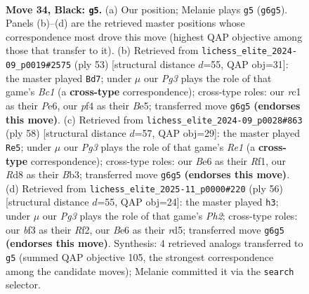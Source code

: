 \documentclass[11pt]{article}
\begin{document}
\clearpage

\begin{figure}[p]\centering
\begin{subfigure}{0.46\textwidth}\centering
\resizebox{\linewidth}{!}{%
\newchessgame
\chessboard[
  setfen={3r1kr1/1p3p1p/4b1p1/p2p4/5P2/3K1BP1/PP3N1P/2R3R1 b - - 2 34},
  showmover=false,
  pgfstyle=straightmove, color=movearrow, markmove={g6-g5}
]}
\caption{}
\end{subfigure}\hfill
\begin{subfigure}{0.46\textwidth}\centering
\resizebox{\linewidth}{!}{%
\newchessgame
\chessboard[
  setfen={r1b2rk1/5p2/p3p2P/4b1p1/Np6/3pB3/PP4P1/2KR3R b - - 1 27},
  showmover=false,
  pgfstyle=straightmove, color=movearrow, markmove={c8-d7}
]}
\caption{}
\end{subfigure}
\\[4pt]
\begin{subfigure}{0.46\textwidth}\centering
\resizebox{\linewidth}{!}{%
\newchessgame
\chessboard[
  setfen={3r1k2/ppr3p1/7p/2P2p2/5P2/1Bn4P/P5PK/4RR2 w - - 0 30},
  showmover=false,
  pgfstyle=straightmove, color=movearrow, markmove={e1-e5}
]}
\caption{}
\end{subfigure}\hfill
\begin{subfigure}{0.46\textwidth}\centering
\resizebox{\linewidth}{!}{%
\newchessgame
\chessboard[
  setfen={4r1k1/8/bp5p/p2r1pp1/8/2B5/PPP2RPP/2R3K1 w - - 0 29},
  showmover=false,
  pgfstyle=straightmove, color=movearrow, markmove={h2-h3}
]}
\caption{}
\end{subfigure}
\caption{\textbf{Move 34, Black: \texttt{g5}.} (a) Our position; Melanie plays \texttt{g5} (\texttt{g6g5}). Panels (b)--(d) are the retrieved master positions whose correspondence most drove this move (highest QAP objective among those that transfer to it). (b) Retrieved from \texttt{lichess\_elite\_2024-09\_p0019\#2575} (ply 53) [structural distance $d$=55, QAP obj=31]: the master played \texttt{Bd7}; under $\mu$ our \emph{Pg3} plays the role of that game's \emph{Bc1} (a \textbf{cross-type} correspondence); cross-type roles: our \emph{r}c1 as their \emph{P}e6, our \emph{p}f4 as their \emph{B}e5; transferred move \texttt{g6g5} \textbf{(endorses this move)}. (c) Retrieved from \texttt{lichess\_elite\_2024-09\_p0028\#863} (ply 58) [structural distance $d$=57, QAP obj=29]: the master played \texttt{Re5}; under $\mu$ our \emph{Pg3} plays the role of that game's \emph{Re1} (a \textbf{cross-type} correspondence); cross-type roles: our \emph{B}e6 as their \emph{R}f1, our \emph{R}d8 as their \emph{B}b3; transferred move \texttt{g6g5} \textbf{(endorses this move)}. (d) Retrieved from \texttt{lichess\_elite\_2025-11\_p0000\#220} (ply 56) [structural distance $d$=55, QAP obj=24]: the master played \texttt{h3}; under $\mu$ our \emph{Pg3} plays the role of that game's \emph{Ph2}; cross-type roles: our \emph{b}f3 as their \emph{R}f2, our \emph{B}e6 as their \emph{r}d5; transferred move \texttt{g6g5} \textbf{(endorses this move)}. Synthesis: 4 retrieved analogs transferred to \texttt{g5} (summed QAP objective 105, the strongest correspondence among the candidate moves); Melanie committed it via the \texttt{search} selector.}
\label{fig:thought-m67}
\end{figure}
\end{document}
